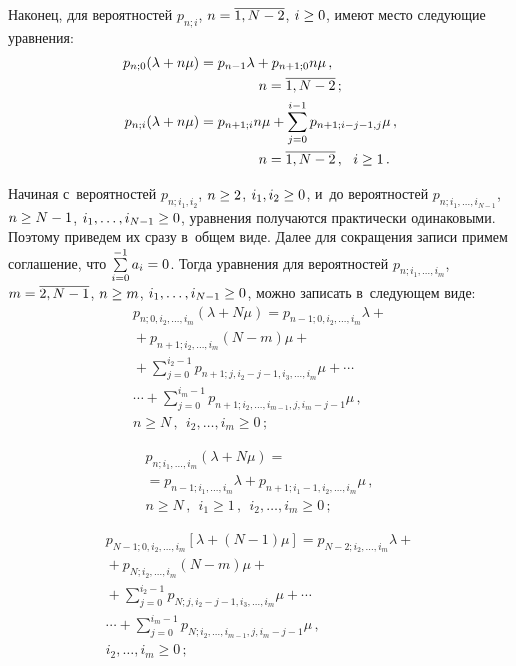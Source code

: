 \begin{multicols}{2}
Наконец, для вероятностей $p_{n;i}$, $n\hm=\overline{1,N-2}$,
$i \hm\ge 0$, имеют место следующие уравнения:
\begin{align}
\label{eq-1-5}
p_{n;0} (\lambda+n\mu) &= p_{n-1} \lambda +
p_{n+1;0} n\mu \,,\notag\\
& \hspace*{15mm}n=\overline{1,N-2}\,;
\\
p_{n;i} (\lambda+n\mu) &= p_{n+1;i} n\mu +
\sum\limits_{j=0}^{i-1} p_{n+1;i-j-1,j} \mu \,,\notag\\ 
&\hspace*{15mm}n=\overline{1,N-2}\,,\ \ i \ge 1\,.
\label{eq-1-6}
\end{align}

Начиная с~вероятностей
$p_{n;i_1,i_2}$, $n\hm\ge2$, $i_1,i_2 \hm\ge 0$,
и~до вероятностей $p_{n;i_1,\ldots,i_{N-1}}$, $n\hm\ge N-1$, $i_1,\ldots,i_{N-1} \hm\ge 0$,
уравнения получаются практически одинаковыми.
Поэтому приведем их сразу в~общем виде.
Далее для сокращения записи примем соглашение, что
$\sum\limits_{i=0}^{-1} a_i \hm= 0$.
Тогда уравнения для вероятностей $p_{n;i_1,\ldots,i_{m}}$, $m\hm=\overline{2,N-1}$, 
$n \hm\ge m$, $i_1,\ldots,i_{N-1} \hm\ge 0$, можно записать в~следующем виде:
\begin{multline}
\label{bat-1}
p_{n;0,i_2,\ldots,i_m} (\lambda+N\mu) = p_{n-1;0,i_2,\ldots,i_m} \lambda+{}\\
{}+ p_{n+1;i_2,\ldots,i_m} (N-m) \mu +{}
\\
{}+ \sum\limits_{j=0}^{i_2-1} p_{n+1;j,i_2-j-1,i_3,\ldots,i_m} \mu
+ \cdots {}\\
{}\cdots + \sum\limits_{j=0}^{i_m-1} p_{n+1;i_2,\ldots,i_{m-1},j,i_m-j-1} \mu\,,\\
 n\ge N\,,\ \ i_2,\ldots,i_m \ge 0\,;
\end{multline}

\vspace*{-12pt}

\noindent
\begin{multline}
\label{bat-2}
p_{n;i_1,\ldots,i_{m}} (\lambda+N\mu) ={}\\
{}= p_{n-1;i_1,\ldots,i_{m}} \lambda
+
p_{n+1;i_1-1,i_2,\ldots,i_{m}} \mu\,,\\ 
n\ge N\,,\ \ i_1\ge 1\,,\ \ i_2,\ldots,i_{m}\ge 0\,;
\end{multline}

\vspace*{-12pt}

\noindent
\begin{multline}
\label{bat-3}
p_{N-1;0,i_2,\ldots,i_{m}} [\lambda+(N-1)\mu] =
p_{N-2;i_2,\ldots,i_{m}} \lambda+{}\\
{}+
p_{N;i_2,\ldots,i_{m}} (N-m) \mu
+{}\\
{}+
\sum\limits_{j=0}^{i_2-1} p_{N;j,i_2-j-1,i_3,\ldots,i_{m}} \mu
+ \cdots{}\\
{}\cdots + \sum\limits_{j=0}^{i_m-1} p_{N;i_2,\ldots,i_{m-1},j,i_m-j-1} \mu\,,\\ 
i_2,\ldots,i_{m} \ge 0\,;
\end{multline}


\end{multicols}
